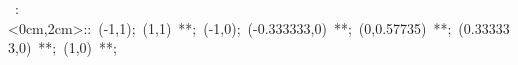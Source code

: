 
% 

\hbox{
\xy    <2cm,0cm>:<0cm,2cm>::
       (-1,1); (1,1)  **\dir{-};
       (-1,0); (-0.333333,0) **\dir{-};  (0,0.57735) **\dir{-}; 
       (0.333333,0) **\dir{-}; (1,0) **\dir{-};
\endxy}

